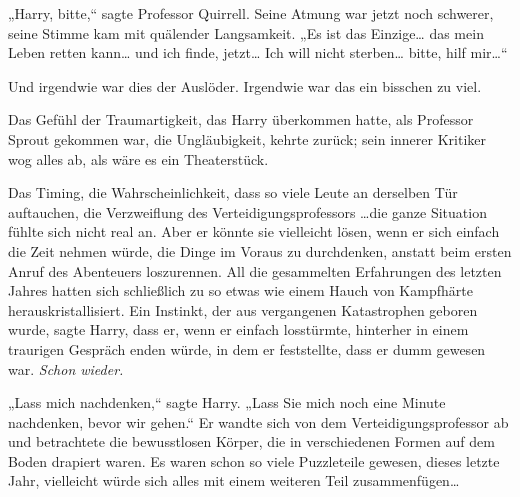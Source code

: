 „Harry, bitte,“ sagte Professor Quirrell.
Seine Atmung war jetzt noch schwerer, seine Stimme kam mit quälender Langsamkeit.
„Es ist das Einzige… das mein Leben retten kann… und ich finde, jetzt… Ich will nicht sterben… bitte, hilf mir…“

Und irgendwie war dies der Auslöder. Irgendwie war das ein bisschen zu viel.

Das Gefühl der Traumartigkeit, das Harry überkommen hatte, als Professor Sprout gekommen war, die Ungläubigkeit, kehrte zurück; sein innerer Kritiker wog alles ab, als wäre es ein Theaterstück.

Das Timing, die Wahrscheinlichkeit, dass so viele Leute an derselben Tür auftauchen, die Verzweiflung des Verteidigungsprofessors
…die ganze Situation fühlte sich nicht real an. Aber er könnte sie vielleicht lösen, wenn er sich einfach die Zeit nehmen würde, die Dinge im Voraus zu durchdenken, anstatt beim ersten Anruf des Abenteuers loszurennen. All die gesammelten Erfahrungen des letzten Jahres hatten sich schließlich zu so etwas wie einem Hauch von Kampfhärte herauskristallisiert. Ein Instinkt, der aus vergangenen Katastrophen geboren wurde, sagte Harry, dass er, wenn er einfach losstürmte, hinterher in einem traurigen Gespräch enden würde, in dem er feststellte, dass er dumm gewesen war. \emph{Schon wieder.}

„Lass mich nachdenken,“ sagte Harry. „Lass Sie mich noch eine Minute nachdenken, bevor wir gehen.“
Er wandte sich von dem Verteidigungsprofessor ab und betrachtete die bewusstlosen Körper, die in verschiedenen Formen auf dem Boden drapiert waren. Es waren schon so viele Puzzleteile gewesen, dieses letzte Jahr, vielleicht würde sich alles mit einem weiteren Teil zusammenfügen…

